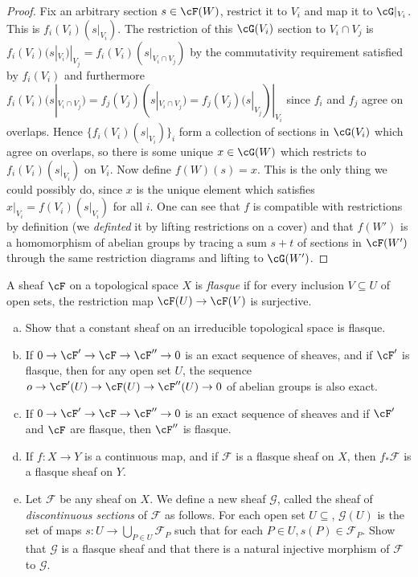 \begin{problemset}
\begin{proof}
		Fix an arbitrary section $s \in \cF(W)$, restrict it to $V_i$ and map it to $\cG|_{V_i}$. This is $f_i(V_i)(s|_{V_i})$. The restriction of this $\cG(V_i)$ section to $V_i\cap V_j$ is $f_i(V_i)(s|_{V_i})|_{V_j} = f_i(V_i)(s|_{V_i\cap V_j})$ by the commutativity requirement satisfied by $f_i(V_i)$ and furthermore $f_i(V_i)(s|_{V_i\cap V_j}) = f_j(V_j)(s|_{V_i\cap V_j}) = f_j(V_j)(s|_{V_j})|_{V_i}$ since $f_i$ and $f_j$ agree on overlaps. Hence $\{f_i(V_i)(s|_{V_i})\}_i$ form a collection of sections in $\cG(V_i)$ which agree on overlaps, so there is some unique $x \in \cG(W)$ which restricts to $f_i(V_i)(s|_{V_i})$ on $V_i$. Now define $f(W)(s) = x$. This is the only thing we could possibly do, since $x$ is the unique element which satisfies $x|_{V_i} = f(V_i)(s|_{V_i})$ for all $i$. One can see that $f$ is compatible with restrictions by definition (we \emph{definted} it by lifting restrictions on a cover) and that $f(W')$ is a homomorphism of abelian groups by tracing a sum $s + t$ of sections in $\cF(W')$ through the same restriction diagrams and lifting to $\cG(W')$.
	\end{proof}
	\item A sheaf $\cF$ on a topological space $X$ is \emph{flasque} if for every inclusion $V\subseteq U$ of open sets, the restriction map $\cF(U) \to \cF(V)$ is surjective.
	\begin{enumerate}[(a)]
		\item Show that a constant sheaf on an irreducible topological space is flasque.
		\item If $0 \to \cF' \to \cF\to \cF''\to 0$ is an exact sequence of sheaves, and if $\cF'$ is flasque, then for any open set $U$, the sequence $o\to \cF'(U)\to \cF(U)\to \cF''(U)\to 0$ of abelian groups is also exact.
		\item If $0 \to \cF' \to \cF \to \cF''\to 0$ is an exact sequence of sheaves and if $\cF'$ and $\cF$ are flasque, then $\cF''$ is flasque.
		\item If $f:X\to Y$ is a continuous map, and if $\mathcal F$ is a flasque sheaf on $X$, then $f_*\mathcal F$ is a flasque sheaf on $Y$.
		\item Let $\mathcal F$ be any sheaf on $X$. We define a new sheaf $\mathcal G$, called the sheaf of \emph{discontinuous sections} of $\mathcal F$ as follows. For each open set $U\subseteq $, $\mathcal G(U)$ is the set of maps $s:U\to \bigcup_{P\in U}\mathcal F_P$ such that for each $P\in U, s(P) \in \mathcal F_P$. Show that $\mathcal G$ is a flasque sheaf and that there is a natural injective morphism of $\mathcal F$ to $\mathcal G$.

\end{enumerate}
\end{problemset}
